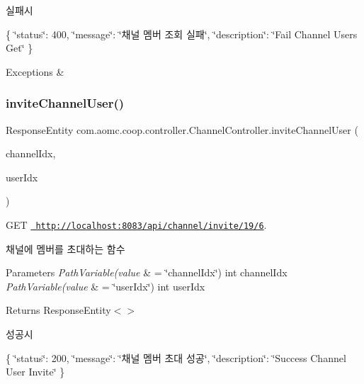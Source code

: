 실패시

\{ \char`\"{}status\char`\"{}\+: 400, \char`\"{}message\char`\"{}\+: \char`\"{}채널 멤버 조회 실패\char`\"{}, \char`\"{}description\char`\"{}\+: \char`\"{}\+Fail Channel Users Get\char`\"{} \}


\begin{DoxyExceptions}{Exceptions}
{\em } & \\
\hline
\end{DoxyExceptions}
\mbox{\label{classcom_1_1aomc_1_1coop_1_1controller_1_1_channel_controller_ac77a77fea57ead2a28ca054029fabba9}} 
\subsubsection{\texorpdfstring{inviteChannelUser()}{inviteChannelUser()}}
{\footnotesize\ttfamily Response\+Entity com.\+aomc.\+coop.\+controller.\+Channel\+Controller.\+invite\+Channel\+User (\begin{DoxyParamCaption}\item[{@Path\+Variable(value=\char`\"{}channel\+Idx\char`\"{}) int}]{channel\+Idx,  }\item[{@Path\+Variable(value=\char`\"{}user\+Idx\char`\"{}) int}]{user\+Idx }\end{DoxyParamCaption})}



G\+ET \href{http://localhost:8083/api/channel/invite/19/6}{\texttt{ http\+://localhost\+:8083/api/channel/invite/19/6}}. 

채널에 멤버를 초대하는 함수


\begin{DoxyParams}{Parameters}
{\em Path\+Variable(value} & = \char`\"{}channel\+Idx\char`\"{}) int channel\+Idx\\
\hline
{\em Path\+Variable(value} & = \char`\"{}user\+Idx\char`\"{}) int user\+Idx\\
\hline
\end{DoxyParams}
\begin{DoxyReturn}{Returns}
Response\+Entity$<$$>$
\end{DoxyReturn}
성공시

\{ \char`\"{}status\char`\"{}\+: 200, \char`\"{}message\char`\"{}\+: \char`\"{}채널 멤버 초대 성공\char`\"{}, \char`\"{}description\char`\"{}\+: \char`\"{}\+Success Channel User Invite\char`\"{} \}

